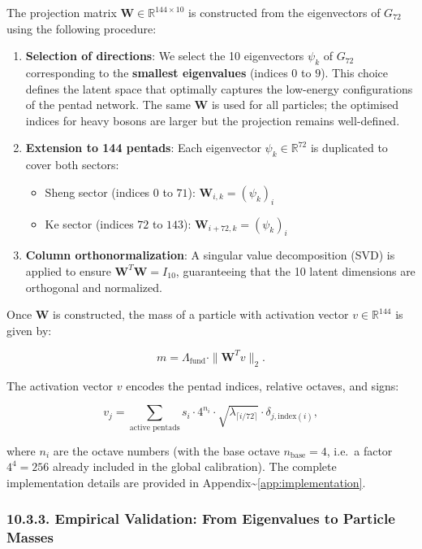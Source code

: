 \documentclass[11pt]{article}
\providecommand{\tightlist}{\setlength{\itemsep}{2pt}\setlength{\parskip}{6pt}}
\providecommand{\tightlist}{%
  \setlength{\itemsep}{2pt}\setlength{\parskip}{6pt}
}
\begin{document}
The projection matrix \(\mathbf{W} \in \mathbb{R}^{144 \times 10}\) is
constructed from the eigenvectors of \(G_{72}\) using the following
procedure:

\begin{enumerate}
\def\labelenumi{\arabic{enumi}.}
\item
  \textbf{Selection of directions}: We select the 10 eigenvectors
  \(\psi_k\) of \(G_{72}\) corresponding to the \textbf{smallest
  eigenvalues} (indices \(0\) to \(9\)). This choice defines the latent
  space that optimally captures the low-energy configurations of the
  pentad network. The same \(\mathbf{W}\) is used for all particles; the
  optimised indices for heavy bosons are larger but the projection
  remains well-defined.
\item
  \textbf{Extension to 144 pentads}: Each eigenvector
  \(\psi_k \in \mathbb{R}^{72}\) is duplicated to cover both sectors:

  \begin{itemize}
  \tightlist
  \item
    Sheng sector (indices \(0\) to \(71\)):
    \(\mathbf{W}_{i,k} = (\psi_k)_i\)
  \item
    Ke sector (indices \(72\) to \(143\)):
    \(\mathbf{W}_{i+72,k} = (\psi_k)_i\)
  \end{itemize}
\item
  \textbf{Column orthonormalization}: A singular value decomposition
  (SVD) is applied to ensure \(\mathbf{W}^T \mathbf{W} = I_{10}\),
  guaranteeing that the 10 latent dimensions are orthogonal and
  normalized.
\end{enumerate}

Once \(\mathbf{W}\) is constructed, the mass of a particle with
activation vector \(v \in \mathbb{R}^{144}\) is given by:

\[
m = \Lambda_{\text{fund}} \cdot \|\mathbf{W}^T v\|_2.
\]

The activation vector \(v\) encodes the pentad indices, relative
octaves, and signs:

\[
v_j = \sum_{\text{active pentads}} s_i \cdot 4^{n_i} \cdot \sqrt{\lambda_{\lceil i/72 \rceil}} \cdot \delta_{j,\text{index}(i)},
\]

where \(n_i\) are the octave numbers (with the base octave
\(n_{\text{base}}=4\), i.e.~a factor \(4^4 = 256\) already included in
the global calibration). The complete implementation details are
provided in Appendix\textasciitilde{}\ref{app:implementation}.

\hypertarget{empirical-validation-from-eigenvalues-to-particle-masses}{%
\subsubsection{10.3.3. Empirical Validation: From Eigenvalues to
Particle
Masses}\label{empirical-validation-from-eigenvalues-to-particle-masses}}
\end{document}
